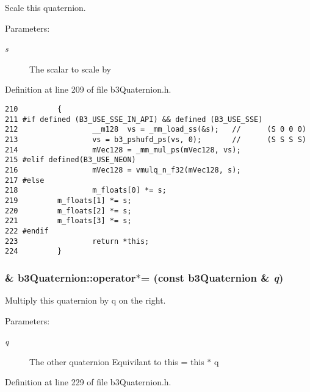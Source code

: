 Scale this quaternion. 

\begin{Desc}
\item[Parameters:]
\begin{description}
\item[{\em s}]The scalar to scale by \end{description}
\end{Desc}


Definition at line 209 of file b3Quaternion.h.

\begin{Code}\begin{verbatim}210         {
211 #if defined (B3_USE_SSE_IN_API) && defined (B3_USE_SSE)
212                 __m128  vs = _mm_load_ss(&s);   //      (S 0 0 0)
213                 vs = b3_pshufd_ps(vs, 0);       //      (S S S S)
214                 mVec128 = _mm_mul_ps(mVec128, vs);
215 #elif defined(B3_USE_NEON)
216                 mVec128 = vmulq_n_f32(mVec128, s);
217 #else
218                 m_floats[0] *= s; 
219         m_floats[1] *= s; 
220         m_floats[2] *= s; 
221         m_floats[3] *= s;
222 #endif
223                 return *this;
224         }
\end{verbatim}
\end{Code}


\hypertarget{classb3_quaternion_756f3ae0fbbdf018fb3d63b95f4ddcaa}{
\subsubsection[operator$\ast$=]{\& b3Quaternion::operator$\ast$= (const {\bf b3Quaternion} \& {\em q})}}
\label{classb3_quaternion_756f3ae0fbbdf018fb3d63b95f4ddcaa}


Multiply this quaternion by q on the right. 

\begin{Desc}
\item[Parameters:]
\begin{description}
\item[{\em q}]The other quaternion Equivilant to this = this $\ast$ q \end{description}
\end{Desc}


Definition at line 229 of file b3Quaternion.h.

